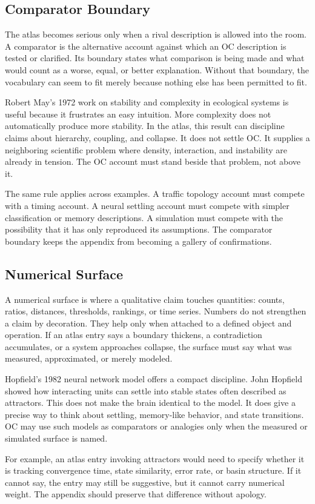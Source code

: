 \documentclass[11pt,a4paper,openany]{book}
\begin{document}
\subsection{Comparator Boundary}
The atlas becomes serious only when a rival description is allowed into the room. A comparator is the alternative account against which an OC description is tested or clarified. Its boundary states what comparison is being made and what would count as a worse, equal, or better explanation. Without that boundary, the vocabulary can seem to fit merely because nothing else has been permitted to fit. \cite{barabasi_scale_free,may_stability_complexity}\par
Robert May's 1972 work on stability and complexity in ecological systems is useful because it frustrates an easy intuition. More complexity does not automatically produce more stability. In the atlas, this result can discipline claims about hierarchy, coupling, and collapse. It does not settle OC. It supplies a neighboring scientific problem where density, interaction, and instability are already in tension. The OC account must stand beside that problem, not above it.\par
The same rule applies across examples. A traffic topology account must compete with a timing account. A neural settling account must compete with simpler classification or memory descriptions. A simulation must compete with the possibility that it has only reproduced its assumptions. The comparator boundary keeps the appendix from becoming a gallery of confirmations.\par
\subsection{Numerical Surface}
A numerical surface is where a qualitative claim touches quantities: counts, ratios, distances, thresholds, rankings, or time series. Numbers do not strengthen a claim by decoration. They help only when attached to a defined object and operation. If an atlas entry says a boundary thickens, a contradiction accumulates, or a system approaches collapse, the surface must say what was measured, approximated, or merely modeled. \cite{barabasi_scale_free,may_stability_complexity}\par
Hopfield's 1982 neural network model offers a compact discipline. John Hopfield showed how interacting units can settle into stable states often described as attractors. This does not make the brain identical to the model. It does give a precise way to think about settling, memory-like behavior, and state transitions. OC may use such models as comparators or analogies only when the measured or simulated surface is named.\par
For example, an atlas entry invoking attractors would need to specify whether it is tracking convergence time, state similarity, error rate, or basin structure. If it cannot say, the entry may still be suggestive, but it cannot carry numerical weight. The appendix should preserve that difference without apology.\par
\end{document}
